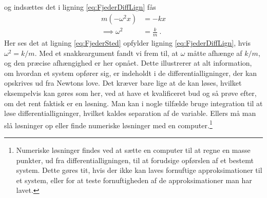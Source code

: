 %
og indsættes det i ligning \eqref{eq:FjederDiffLign} fås
%
\begin{align}
	m(-\omega^2x) &= -kx \nonumber\\
	\implies \omega^2 &= \frac{k}{m} \: .
\end{align}
%
Her ses det at ligning \eqref{eq:FjederSted} opfylder ligning \eqref{eq:FjederDiffLign}, hvis $\omega^2 = k/m$. Med et snakkeargument fandt vi frem til, at $\omega$ måtte afhænge af $k/m$, og den præcise afhængighed er her opnået. Dette illustrerer at alt information, om hvordan et system opfører sig, er indeholdt i de differentialligninger, der kan opskrives ud fra Newtons love. Det kræver bare lige at de kan løses, hvilket eksempelvis kan gøres som her, ved at have et kvalificeret bud og så prøve efter, om det rent faktisk er en løsning. Man kan i nogle tilfælde bruge integration til at løse differentialligninger, hvilket kaldes separation af de variable. Ellers må man slå løsninger op eller finde numeriske løsninger med en computer.\footnote{Numeriske løsninger findes ved at sætte en computer til at regne en masse punkter, ud fra differentialligningen, til at forudsige opførslen af et bestemt system. Dette gøres tit, hvis der ikke kan laves fornuftige approksimationer til et system, eller for at teste fornuftigheden af de approksimationer man har lavet.} \\


